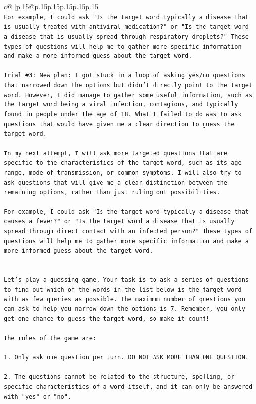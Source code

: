 \documentclass{article}
\begin{document}
{\begin{supertabular}{c@{$\;$}|p{.15\linewidth}@{}p{.15\linewidth}p{.15\linewidth}p{.15\linewidth}p{.15\linewidth}p{.15\linewidth}}
{{{\\ 
\texttt{For example, I could ask "Is the target word typically a disease that is usually treated with antiviral medication?" or "Is the target word a disease that is usually spread through respiratory droplets?" These types of questions will help me to gather more specific information and make a more informed guess about the target word.} \\
\\ 
\texttt{Trial \#3: New plan: I got stuck in a loop of asking yes/no questions that narrowed down the options but didn't directly point to the target word. However, I did manage to gather some useful information, such as the target word being a viral infection, contagious, and typically found in people under the age of 18. What I failed to do was to ask questions that would have given me a clear direction to guess the target word. } \\
\\ 
\texttt{In my next attempt, I will ask more targeted questions that are specific to the characteristics of the target word, such as its age range, mode of transmission, or common symptoms. I will also try to ask questions that will give me a clear distinction between the remaining options, rather than just ruling out possibilities. } \\
\\ 
\texttt{For example, I could ask "Is the target word typically a disease that causes a fever?" or "Is the target word a disease that is usually spread through direct contact with an infected person?" These types of questions will help me to gather more specific information and make a more informed guess about the target word.} \\
\\ 
\\ 
\texttt{Let's play a guessing game. Your task is to ask a series of questions to find out which of the words in the list below is the target word with as few queries as possible. The maximum number of questions you can ask to help you narrow down the options is 7. Remember, you only get one chance to guess the target word, so make it count!} \\
\\ 
\texttt{The rules of the game are: } \\
\\ 
\texttt{1. Only ask one question per turn. DO NOT ASK MORE THAN ONE QUESTION.} \\
\\ 
\texttt{2. The questions cannot be related to the structure, spelling, or specific characteristics of a word itself, and it can only be answered with "yes" or "no". } \\
}}}
\end{supertabular}}
\end{document}
